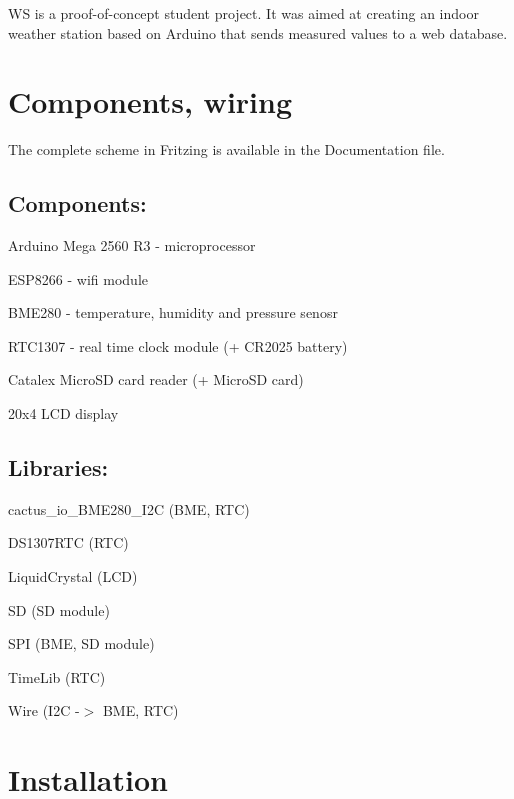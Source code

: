 WS is a proof-\/of-\/concept student project. It was aimed at creating an indoor weather station based on Arduino that sends measured values to a web database.

\section*{Components, wiring}

 The complete scheme in Fritzing is available in the Documentation file.

\subsection*{Components\+:}


\begin{DoxyItemize}
\item Arduino Mega 2560 R3 -\/ microprocessor
\item E\+S\+P8266 -\/ wifi module
\item B\+M\+E280 -\/ temperature, humidity and pressure senosr
\item R\+T\+C1307 -\/ real time clock module (+ C\+R2025 battery)
\item Catalex Micro\+SD card reader (+ Micro\+SD card)
\item 20x4 L\+CD display
\end{DoxyItemize}

\subsection*{Libraries\+:}


\begin{DoxyItemize}
\item cactus\+\_\+io\+\_\+\+B\+M\+E280\+\_\+\+I2C (B\+ME, R\+TC)
\item D\+S1307\+R\+TC (R\+TC)
\item Liquid\+Crystal (L\+CD)
\item SD (SD module)
\item S\+PI (B\+ME, SD module)
\item Time\+Lib (R\+TC)
\item Wire (I2C -\/$>$ B\+ME, R\+TC)
\end{DoxyItemize}

\section*{Installation}

